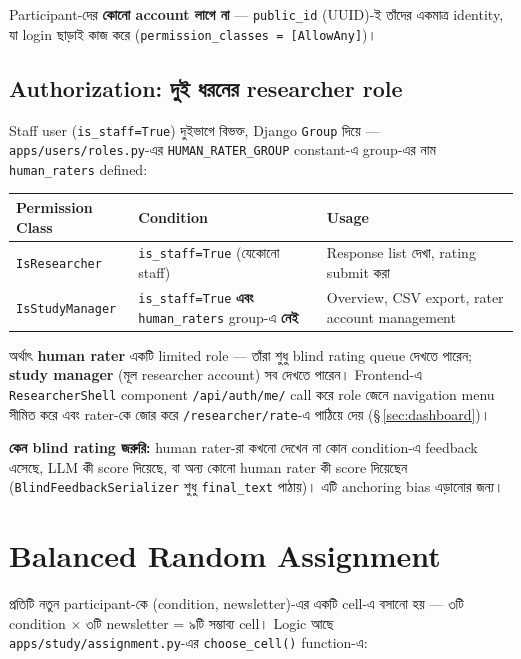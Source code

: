 \documentclass[11pt,a4paper]{article}
\newcommand{\code}[1]{\texttt{\small #1}}
\newcommand{\file}[1]{\texttt{\small #1}}
\newcommand{\summarybox}[1]{%
  \begin{center}
  \colorbox{softbg}{\parbox{0.94\textwidth}{#1}}
  \end{center}
}
\begin{document}
Participant-দের \textbf{কোনো account লাগে না} --- \code{public\_id} (UUID)-ই তাঁদের একমাত্র
identity, যা login ছাড়াই কাজ করে (\code{permission\_classes = [AllowAny]})।

\subsection{Authorization: দুই ধরনের researcher role}
Staff user (\code{is\_staff=True}) দুইভাগে বিভক্ত, Django \code{Group} দিয়ে ---
\file{apps/users/roles.py}-এর \code{HUMAN\_RATER\_GROUP} constant-এ group-এর নাম
\code{human\_raters} defined:

\begin{longtable}{@{}p{3.4cm}p{5.6cm}p{6.4cm}@{}}
\toprule
\textbf{Permission Class} & \textbf{Condition} & \textbf{Usage} \\
\midrule
\endhead
\code{IsResearcher} & \code{is\_staff=True} (যেকোনো staff) & Response list দেখা, rating
  submit করা \\
\code{IsStudyManager} & \code{is\_staff=True} \textbf{এবং} \code{human\_raters} group-এ
  \textbf{নেই} & Overview, CSV export, rater account management \\
\bottomrule
\end{longtable}

অর্থাৎ \textbf{human rater} একটি limited role --- তাঁরা শুধু blind rating queue দেখতে
পারেন; \textbf{study manager} (মূল researcher account) সব দেখতে পারেন। Frontend-এ
\code{ResearcherShell} component \code{/api/auth/me/} call করে role জেনে navigation menu
সীমিত করে এবং rater-কে জোর করে \code{/researcher/rate}-এ পাঠিয়ে দেয় (\S\,\ref{sec:dashboard})।

\summarybox{%
  \textbf{কেন blind rating জরুরি:} human rater-রা কখনো দেখেন না কোন condition-এ feedback
  এসেছে, LLM কী score দিয়েছে, বা অন্য কোনো human rater কী score দিয়েছেন
  (\code{BlindFeedbackSerializer} শুধু \code{final\_text} পাঠায়)। এটি anchoring bias এড়ানোর
  জন্য।
}

\newpage
\section{Balanced Random Assignment}
\label{sec:assign}

প্রতিটি নতুন participant-কে (condition, newsletter)-এর একটি cell-এ বসানো হয় --- ৩টি
condition $\times$ ৩টি newsletter = ৯টি সম্ভাব্য cell। Logic আছে
\file{apps/study/assignment.py}-এর \code{choose\_cell()} function-এ:
\end{document}
